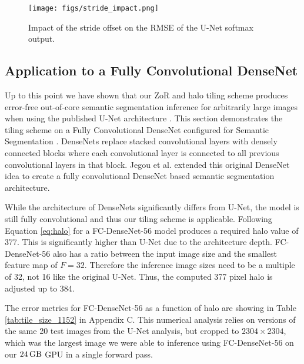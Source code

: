 \documentclass[runningheads]{llncs}
\begin{document}
\begin{figure}
	\texttt{[image: figs/stride\_impact.png]}
		\caption{Impact of the stride offset on the RMSE of the U-Net softmax output.}
		\label{fig:stride-impact}
\end{figure} 
	

\subsection{Application to a Fully Convolutional DenseNet}

Up to this point we have shown that our ZoR and halo tiling scheme produces error-free out-of-core semantic segmentation inference for arbitrarily large images when using the published U-Net architecture \cite{Ronneberger2015a}. 
This section demonstrates the tiling scheme on a Fully Convolutional DenseNet configured for Semantic Segmentation \cite{Jegou2017}. DenseNets \cite{Huang2017} replace stacked convolutional layers with densely connected blocks where each convolutional layer is connected to all previous convolutional layers in that block. Jegou et al. \cite{Jegou2017} extended this original DenseNet idea to create a fully convolutional DenseNet based semantic segmentation architecture. 

While the architecture of DenseNets significantly differs from U-Net, the model is still fully convolutional and thus our tiling scheme is applicable. Following Equation \ref{eq:halo} for a FC-DenseNet-56 \cite{Jegou2017} model produces a required halo value of 377. This is significantly higher than U-Net due to the architecture depth. FC-DenseNet-56 also has a ratio between the input image size and the smallest feature map of $F = 32$. Therefore the inference image sizes need to be a multiple of 32, not 16 like the original U-Net. Thus, the computed 377 pixel halo is adjusted up to 384. 

The error metrics for FC-DenseNet-56 as a function of halo are showing in Table \ref{tab:tile_size_1152} in Appendix C. This numerical analysis relies on versions of the same 20 test images from the U-Net analysis, but cropped to $\num{2304} \times \num{2304}$, which was the largest image we were able to inference using FC-DenseNet-56 on our $\SI{24}{\giga\byte}$ GPU in a single forward pass. 
\end{document}
